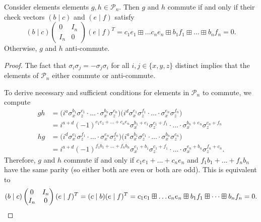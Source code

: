 \documentclass[a4paper, oneside, 12pt]{amsart}
\newcommand*{\PauliGroup}{\ensuremath{\mathcal{P}}}
\begin{document}
\begin{lemma}\label{lem:pauli-commutativity}
  Consider elements elements \(g,h\in \PauliGroup_{n}\).
  Then \(g\) and \(h\) commute if and only if their check vectors \((b \mid c)\) and \((e \mid f)\) satisfy
  \begin{equation}
    (b \mid c)
    \begin{pmatrix}
      0 & I_{n} \\
      I_{n} & 0
    \end{pmatrix} (e \mid f)^{T} = c_{1}e_{1} \boxplus \dots c_{n}e_{n} \boxplus b_{1}f_{1}\boxplus \dots \boxplus b_{n}f_{n} = 0.
  \end{equation}
  Otherwise, \(g\) and \(h\) anti-commute.
\end{lemma}
\begin{proof}
  The fact that \(\sigma_{i} \sigma_{j} = - \sigma_{j}\sigma_{i}\) for all \(i,j \in\{x,y,z\}\) distinct implies that the elements of \(\PauliGroup_{n}\) either commute or anti-commute.

  To derive necessary and sufficient conditions for elements in \(\PauliGroup_{n}\) to commute, we compute
  \begin{align*}
    gh
    & = \big(i^{a}\sigma_{x}^{b_{1}}\sigma_{z}^{c_{1}} \cdot \dotsc \cdot \sigma_{x}^{b_{n}} \sigma_{z}^{c_{n}}\big)
    \big(i^{d}\sigma_{x}^{e_{1}}\sigma_{z}^{f_{1}} \cdot \dotsc \cdot \sigma_{x}^{e_{n}} \sigma_{z}^{f_{n}}\big)\\
    & = i^{a+d}(-1)^{c_{1}e_{1}+ \dots + c_{n} e_{n}} \sigma_{x}^{b_{1}+e_{1}}\sigma_{z}^{c_{1}+f_{1}} \cdot \dotsc\cdot \sigma_{x}^{b_{n}+e_{n}}\sigma_{z}^{c_{n}+f_{n}}\\
    hg
    & = \big(i^{d}\sigma_{x}^{e_{1}}\sigma_{z}^{f_{1}} \cdot \dotsc \cdot \sigma_{x}^{e_{n}} \sigma_{z}^{f_{n}}\big)
      \big(i^{a}\sigma_{x}^{b_{1}}\sigma_{z}^{c_{1}} \cdot \dotsc \cdot \sigma_{x}^{b_{n}} \sigma_{z}^{c_{n}}\big)
    \\
    & = i^{a+d}(-1)^{f_{1}b_{1}+ \dots + f_{n} b_{n}} \sigma_{x}^{e_{1}+b_{1}}\sigma_{z}^{c_{1}+f_{1}} \cdot \dotsc\cdot \sigma_{x}^{e_{n}+b_{n}}\sigma_{z}^{f_{n}+c_{n}}.
  \end{align*}
  Therefore, \(g\) and \(h\) commute if and only if \(c_{1}e_{1}+ \dots + c_{n}e_{n}\) and \(f_{1}b_{1} +\dots + f_{n}b_{n}\) have the same parity (so either both are even or both are odd).
  This is equivalent to
  \begin{equation*}
    (b \mid c)
    \begin{pmatrix}
      0 & I_{n} \\
      I_{n} & 0
    \end{pmatrix}
    (e \mid f)^{T}
    = (c \mid b)(e \mid f)^{T}
    = c_{1}e_{1} \boxplus \dots c_{n}e_{n} \boxplus b_{1}f_{1}\boxplus \dots \boxplus b_{n}f_{n} =0. \qedhere
  \end{equation*}
\end{proof}
\end{document}
